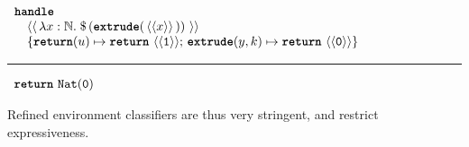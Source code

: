 \begin{code}
  \begin{efflst}
    $\begin{array}{l}
      \textbf{\texttt{handle}} \\
      \quad \equote[\, {\lambda x:\mathbb{N}.\; \splice[\, {(\textbf{\texttt{extrude}}(\, \equote[x] \, ))}\, ]} \, ]  \\
      \quad \{ \textbf{\texttt{return}}(u) \mapsto \return{\equote[{\texttt{1}}]};  \, \textbf{\texttt{extrude}}(y, k) \mapsto { \return{\equote[\texttt{0}]}} \}\\
    \end{array}$

    \vspace{2mm} 
\textcolor{effComment}{\hrule height 0.2mm \relax}
\vspace{2mm} 

\textcolor{effComment}{$\begin{array}{l}\return{\texttt{Nat}(\texttt{0})}\end{array}$}

\end{efflst}
%
\label{listing:efflang-no-scope-extrusion}
\end{code}

Refined environment classifiers are thus very stringent, and restrict expressiveness. 